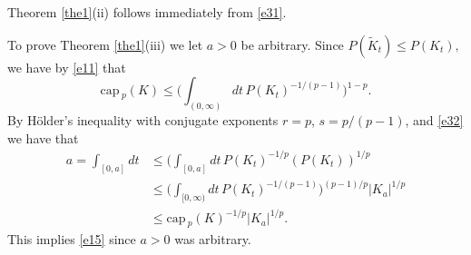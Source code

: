 \documentclass[a4paper,9pt]{article}
\def\cp{\mathrm{cap}\,}
\begin{document}
\smallskip

Theorem \ref{the1}(ii) follows immediately from \eqref{e31}.

\smallskip

To prove Theorem \ref{the1}(iii) we let $a>0$ be arbitrary. Since $P(\tilde{K}_t)\le P(K_t),$ we have by \eqref{e11} that
\begin{equation}\label{e32}
\cp_p(K)\le \Big(\int_{(0,\infty)}dt\, P(K_{t})^{-1/(p-1)}\Big)^{1-p}.
\end{equation}
By H\"older's inequality with conjugate exponents $r=p$, $s=p/(p-1)$, and \eqref{e32} we have that
\begin{align*}%
a=\int_{[0,a]} dt&\le \Big(\int_{[0,a]}dt\,P(K_t)^{-1/p}(P(K_t))^{1/p}\nonumber\\&\le
\Big(\int_{[0,\infty)}dt\,P(K_t)^{-1/(p-1)}\Big)^{(p-1)/p}|K_a|^{1/p}\nonumber\\&
\le \cp_p(K)^{-1/p}|K_a|^{1/p}.
\end{align*}
This implies \eqref{e15} since $a>0$ was arbitrary.


\smallskip
\end{document}
